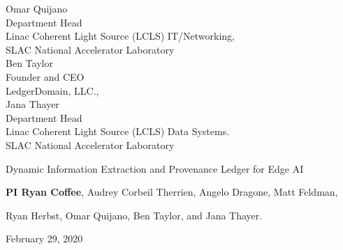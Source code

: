 \documentclass{article}
\begin{document}
\begin{centering}
	Omar Quijano\\
	Department Head\\
	Linac Coherent Light Source (LCLS) IT/Networking,\\
	SLAC National Accelerator Laboratory\\
	\vspace{.5\baselineskip}
	Ben Taylor\\
	Founder and CEO\\
	LedgerDomain, LLC.,\\
	\vspace{.5\baselineskip}
	Jana Thayer\\
	Department Head\\
	Linac Coherent Light Source (LCLS) Data Systems.\\
	SLAC National Accelerator Laboratory\\
\end{centering}
\thispagestyle{empty}
\break
\addtocounter{page}{-1}
\centerline{\large{Dynamic Information Extraction and Provenance Ledger for Edge AI}}
\normalsize
\vspace{0.5\baselineskip}
\centerline{\textbf{PI Ryan Coffee},
Audrey Corbeil Therrien,
Angelo Dragone,
Matt Feldman,}
\centerline{
Ryan Herbst,
Omar Quijano,
Ben Taylor, and 
Jana Thayer.
}
\centerline{February 29, 2020}
\vspace{0.5\baselineskip}
\end{document}
